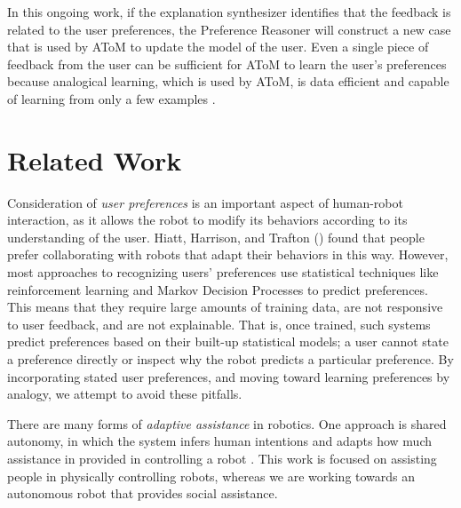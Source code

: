 \documentclass[letterpaper]{article} %
\begin{document}
In this ongoing work, if the explanation synthesizer identifies that the feedback is related
to the user preferences, the Preference Reasoner will construct a new
case that is used by AToM to update the model of the user.  Even a single
piece of feedback from the user can be sufficient for AToM to learn the
user's preferences because analogical learning, which is used by AToM, is
data efficient and capable of learning from only a few examples
\cite{chen2019human,wilson2019analogical}.


\section{Related Work}
Consideration of \textit{user preferences} is an important aspect of human-robot interaction, as it allows the robot to modify its behaviors according to its understanding of the user. Hiatt, Harrison, and Trafton (\citeyear{hiatt2011accommodating}) found that people prefer collaborating with robots that adapt their behaviors in this way. However, most approaches to recognizing users' preferences use statistical techniques like reinforcement learning \cite{woodworth2018preference} and Markov Decision Processes \cite{munzer2017preference} to predict preferences. This means that they require large amounts of training data, are not responsive to user feedback, and are not explainable. That is, once trained, such systems predict preferences based on their built-up statistical models; a user cannot state a preference directly or inspect why the robot predicts a particular preference. By incorporating stated user preferences, and moving toward learning preferences by analogy, we attempt to avoid these pitfalls.

There are many forms of \textit{adaptive assistance} in robotics.  One approach is
shared autonomy, in which the system infers human intentions and adapts how
much assistance in provided in controlling a robot \cite{Nikolaidis2017,Jain2019}.
This work is focused on assisting people in physically controlling robots,
whereas we are working towards an autonomous robot that provides social assistance.
\end{document}
